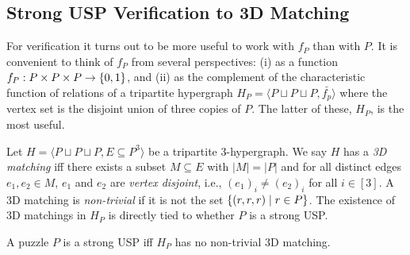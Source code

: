 \documentclass[11pt]{article}
\newcommand\sse{\subseteq}
\newcommand\condset[2]{\set{#1 \;|\; #2}}
\begin{document}


\subsection{Strong USP Verification to 3D Matching}
\label{sec:3DM}

For verification it turns out to be more useful to work with $f_P$
than with $P$.  It is convenient to think of $f_P$ from several
perspectives: (i) as a function $f_P : P \times P \times P \rightarrow
\left\{ 0, 1 \right\}$,
and (ii) as the complement of the
characteristic function of relations of a tripartite
hypergraph $H_P = \langle P \sqcup P \sqcup P, \bar{f_p}\rangle$ where
the vertex set is the disjoint union of three copies of $P$.  The latter of these, $H_P$, is the most useful.

Let $H = \langle P \sqcup P \sqcup P, E \sse P^3\rangle$ be a
tripartite 3-hypergraph.  We say $H$ has a \emph{3D matching} iff
there exists a subset $M \sse E$ with $|M| = |P|$ and for all distinct
edges $e_1, e_2 \in M$, $e_1$ and $e_2$ are \emph{vertex
  disjoint}, i.e., $(e_1)_i \neq (e_2)_i$ for all $i \in [3]$.  A 3D matching is \emph{non-trivial} if it is not the set
$\condset{(r,r,r)}{r \in P}$.  The existence of 3D matchings in $H_P$
is directly tied to whether $P$ is a strong USP.

\begin{lemma}
  \label{lem:verify-to-3dm}
  A puzzle $P$ is a strong USP iff $H_P$ has no non-trivial 3D
  matching.
\end{lemma}
\end{document}
